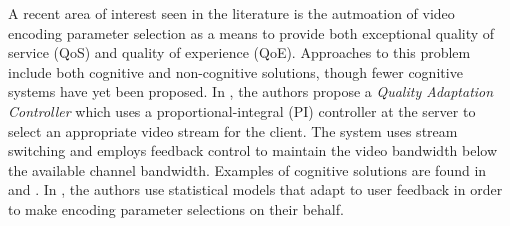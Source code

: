 
A recent area of interest seen in the literature is the autmoation of video encoding parameter selection as a means to provide both exceptional quality of service (QoS) and quality of experience (QoE). Approaches to this problem include both cognitive and non-cognitive solutions, though fewer cognitive systems have yet been proposed. In \cite{FeedbackControl}, the authors propose a \emph{Quality Adaptation Controller} which uses a proportional-integral (PI) controller at the server to select an appropriate video stream for the client. The system uses stream switching and employs feedback control to maintain the video bandwidth below the available channel bandwidth. Examples of cognitive solutions are found in \cite{pan2007quality} and \cite{wang2005classification}. In \cite{pan2007quality}, the authors use statistical models that adapt to user feedback in order to make encoding parameter selections on their behalf.

